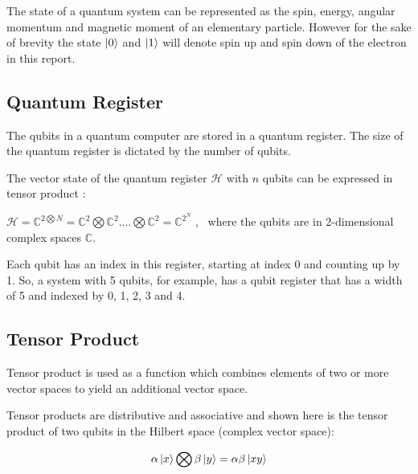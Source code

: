 \documentclass{article}
\begin{document}
\vspace{5mm}

\noindent
The state of a quantum system can be represented as the spin, energy, angular momentum and magnetic moment of an elementary particle. However for the sake of brevity the state $\ket{0}$ and $\ket{1}$ will denote spin up and spin down of the electron in this report.
\vspace{10mm}

\subsection{Quantum Register}
\vspace{5mm}

\noindent
The qubits in a quantum computer are stored in a quantum register. The size of the quantum register is dictated by the number of qubits. 
\vspace{5mm}

\noindent
The vector state of the quantum register $\mathcal{H}$ with $n$ qubits can be expressed in tensor product \cite{noauthor_lecture_nodate}:
\vspace{5mm}


\qquad $\mathcal{H} = \mathbb{C}^{2\bigotimes N} = \mathbb{C}^2 \bigotimes\mathbb{C}^2 ....\bigotimes\mathbb{C}^2 = \mathbb{C}^{2^N} $ , \  where the qubits are in 2-dimensional complex spaces $\mathbb{C}$.
\vspace{5mm}

\noindent
Each qubit has an index in this register, starting at index 0 and counting up by 1. So, a system with 5 qubits, for example, has a qubit register that has a width of 5 and indexed by 0, 1, 2, 3 and 4.

\subsection{Tensor Product}
\vspace{5mm}

\noindent
Tensor product is used as a function which combines elements of two or more vector spaces to yield an additional vector space. 
\vspace{5mm}

\noindent
Tensor products are distributive and associative and shown here is the tensor product of two qubits in the Hilbert space (complex vector space)\cite{noauthor_lecture_nodate}:
\vspace{5mm}


\begin{equation}
\alpha\ket{x} \bigotimes \beta\ket{y} = \alpha\beta\ket{xy}
\end{equation}
\vspace{5mm}
\end{document}
